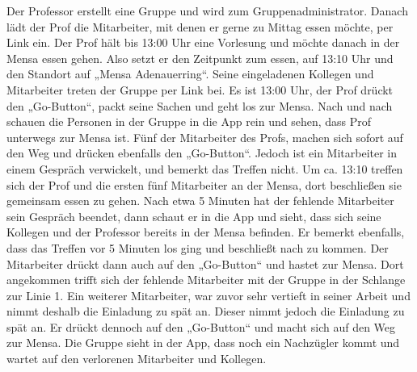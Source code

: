 Der Professor erstellt eine Gruppe und wird zum Gruppenadministrator. Danach lädt der Prof die Mitarbeiter, mit denen er gerne zu Mittag essen möchte, per Link ein. Der Prof hält bis 13:00 Uhr eine Vorlesung und möchte danach in der Mensa essen gehen. Also setzt er den Zeitpunkt zum essen, auf 13:10 Uhr und den Standort auf „Mensa Adenauerring“. Seine eingeladenen Kollegen und Mitarbeiter treten der Gruppe per Link bei. Es ist 13:00 Uhr, der Prof drückt den „Go-Button“, packt seine Sachen und geht los zur Mensa. Nach und nach schauen die Personen in der Gruppe in die App rein und sehen, dass Prof unterwegs zur Mensa ist. Fünf der Mitarbeiter des Profs, machen sich sofort auf den Weg und drücken ebenfalls den „Go-Button“. Jedoch ist ein Mitarbeiter in einem Gespräch verwickelt, und bemerkt das Treffen nicht. Um ca. 13:10 treffen sich der Prof und die ersten fünf Mitarbeiter an der Mensa, dort beschließen sie gemeinsam essen zu gehen. Nach etwa 5 Minuten hat der fehlende Mitarbeiter sein Gespräch beendet, dann schaut er in die App und sieht, dass sich seine Kollegen und der Professor bereits in der Mensa befinden. Er bemerkt ebenfalls, dass das Treffen vor 5 Minuten los ging und beschließt nach zu kommen. Der Mitarbeiter drückt dann auch auf den „Go-Button“ und hastet zur Mensa. Dort angekommen trifft sich der fehlende Mitarbeiter mit der Gruppe in der Schlange zur Linie 1. Ein weiterer Mitarbeiter, war zuvor sehr vertieft in seiner Arbeit und nimmt deshalb die Einladung zu spät an. Dieser nimmt jedoch die Einladung zu spät an. Er drückt dennoch auf den „Go-Button“ und macht sich auf den Weg zur Mensa. Die Gruppe sieht in der App, dass noch ein Nachzügler kommt und wartet auf den verlorenen Mitarbeiter und Kollegen.\\